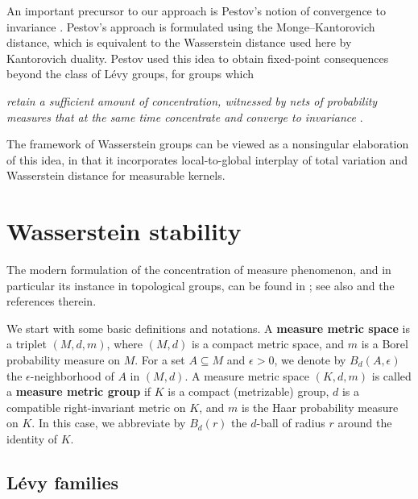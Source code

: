 \documentclass{amsart}
\numberwithin{equation}{subsection}
\theoremstyle{plain}
\theoremstyle{definition}
\theoremstyle{plain}
\begin{document}
An important precursor to our approach is Pestov's notion of convergence to invariance \cite[\S5]{Pestov2010}. Pestov's approach is formulated using the Monge--Kantorovich distance, which is equivalent to the Wasserstein distance used here by Kantorovich duality. Pestov used this idea to obtain fixed-point consequences beyond the class of L\'{e}vy groups, for groups which
\begin{center}
\begin{minipage}{0.94\textwidth}
    \emph{retain a sufficient amount of concentration, witnessed by nets of probability measures that at the same time concentrate and converge to invariance} \cite[p.~386]{Pestov2010}.
\end{minipage}
\end{center}
The framework of Wasserstein groups can be viewed as a nonsingular elaboration of this idea, in that it incorporates local-to-global interplay of total variation and Wasserstein distance for measurable kernels.

\section{Wasserstein stability}

The modern formulation of the concentration of measure phenomenon, and in particular its instance in topological groups, can be found in \cite{gromov1983, milman1988heritage, glasner2005automorphism, Pestov2006, Pestov2010}; see also \cite[\S1-2]{talagrand1996new} and the references therein.

\smallskip

We start with some basic definitions and notations. A {\bf measure metric space} is a triplet \(\left(M,d,m\right)\), where \(\left(M,d\right)\) is a compact metric space, and \(m\) is a Borel probability measure on \(M\). For a set \(A\subseteq M\) and \(\epsilon>0\), we denote by \(B_{d}\left(A,\epsilon\right)\) the \(\epsilon\)-neighborhood of \(A\) in \(\left(M,d\right)\). A measure metric space \(\left(K,d,m\right)\) is called a {\bf measure metric group} if \(K\) is a compact (metrizable) group, \(d\) is a compatible right-invariant metric on \(K\), and \(m\) is the Haar probability measure on \(K\). In this case, we abbreviate by \(B_{d}\left(r\right)\) the \(d\)-ball of radius \(r\) around the identity of \(K\).

\subsection{L\'{e}vy families}
\end{document}
